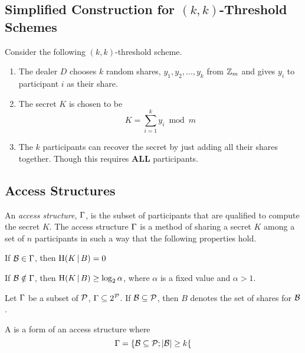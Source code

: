 \subsection{\texorpdfstring{Simplified Construction for $(k, k)$-Threshold Schemes}{Simplified Construction for Threshold Schemes}}\label{subsec:Simplified_Construction_Threshold_Schemes}
Consider the following $(k, k)$-threshold scheme.
\begin{enumerate}[noitemsep]
\item The dealer $D$ chooses $k$ random shares, $y_{1}, y_{2}, \ldots, y_{k}$ from $\operatorname{\mathbb{Z}}_{m}$ and gives $y_{i}$ to participant $i$ as their share.
\item The secret $K$ is chosen to be
  \begin{equation}\label{eq:Simplified_Construction_Threshold_Scheme}
    K = \sum\limits_{i=1}^{k}y_{i} \bmod m
  \end{equation}
\item The $k$ participants can recover the secret by just adding all their shares together. Though this requires \textbf{ALL} participants.
\end{enumerate}

\subsection{Access Structures}\label{subsec:Access_Structures}
\begin{definition}\label{def:Access_Structure}
  An \emph{access structure}, $\operatorname{\Gamma}$, is the subset of participants that are qualified to compute the secret $K$.
  The access structure $\operatorname{\Gamma}$ is a method of sharing a secret $K$ among a set of $n$ participants in such a way that the following properties hold.
  \begin{propertylist}
  \item If $\operatorname{\mathcal{B}} \in \operatorname{\Gamma}$, then $\operatorname{\operatorname{H}}(K \operatorname{\vert} B) = 0$
  \item If $\operatorname{\mathcal{B}} \notin \operatorname{\Gamma}$, then $\operatorname{\operatorname{H}}(K \operatorname{\vert} B) \geq \log_{2} \alpha$, where $\alpha$ is a fixed value and $\alpha > 1$.
  \end{propertylist}

  Let $\operatorname{\Gamma}$ be a subset of $\operatorname{\mathcal{P}}$, $\operatorname{\Gamma} \subseteq 2^{\operatorname{\mathcal{P}}}$.
  If $\operatorname{\mathcal{B}} \subseteq \operatorname{\mathcal{P}}$, then $B$ denotes the set of shares for $\operatorname{\mathcal{B}}$.

  \begin{remark}\label{rmk:kn_Threshold_Access_Structure}
    A  is a form of an access structure where
    \begin{equation*}
      \operatorname{\Gamma} = \lbrace \operatorname{\mathcal{B}} \subseteq \operatorname{\mathcal{P}}; \lvert \operatorname{\mathcal{B}} \rvert \geq k \lbrace
    \end{equation*}
  \end{remark}
\end{definition}

